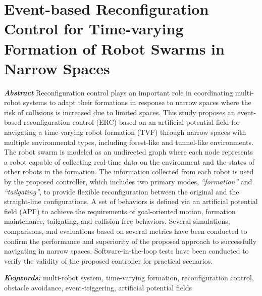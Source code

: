 \chapter{Event-based Reconfiguration Control for Time-varying Formation of Robot Swarms in Narrow Spaces}\label{paper2}

\vspace{1cm}

\noindent\textit{\textbf{Abstract}}
Reconfiguration control plays an important role in coordinating multi-robot systems to adapt their formations in response to narrow spaces where the risk of collisions is increased due to limited spaces. This study proposes an event-based reconfiguration control (ERC) based on an artificial potential field for navigating a time-varying robot formation (TVF) through narrow spaces with multiple environmental types, including forest-like and tunnel-like environments. The robot swarm is modeled as an undirected graph where each node represents a robot capable of collecting real-time data on the environment and the states of other robots in the formation. The information collected from each robot is used by the proposed controller, which includes two primary modes, \textit{``formation''} and \textit{``tailgating''}, to provide flexible reconfiguration between the original and the straight-line configurations. A set of behaviors is defined via an artificial potential field (APF) to achieve the requirements of goal-oriented motion, formation maintenance, tailgating, and collision-free behaviors. Several simulations, comparisons, and evaluations based on several metrics have been conducted to confirm the performance and superiority of the proposed approach to successfully navigating in narrow spaces. Software-in-the-loop tests have been conducted to verify the validity of the proposed controller for practical scenarios.

\noindent\textbf{\textit{Keywords:}}
multi-robot system, time-varying formation, reconfiguration control, obstacle avoidance, event-triggering, artificial potential fields







